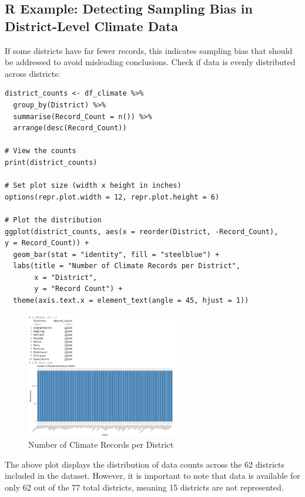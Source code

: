 \subsection*{R Example: Detecting Sampling Bias in District-Level Climate Data}

If some districts have far fewer records, this indicates sampling bias that should be addressed to avoid misleading conclusions. Check if data is evenly distributed across districts:

\begin{verbatim}
district_counts <- df_climate %>%
  group_by(District) %>%
  summarise(Record_Count = n()) %>%
  arrange(desc(Record_Count))

# View the counts
print(district_counts)

# Set plot size (width x height in inches)
options(repr.plot.width = 12, repr.plot.height = 6)

# Plot the distribution
ggplot(district_counts, aes(x = reorder(District, -Record_Count), 
y = Record_Count)) +
  geom_bar(stat = "identity", fill = "steelblue") +
  labs(title = "Number of Climate Records per District",
       x = "District",
       y = "Record Count") +
  theme(axis.text.x = element_text(angle = 45, hjust = 1))
\end{verbatim}

\begin{figure}[h]
\centering
\includegraphics[width=0.6\textwidth]{figures/dist_count.png}
\caption{Number of Climate Records per District}
\end{figure}

The above plot displays the distribution of data counts across the 62 districts included in the dataset. However, it is important to note that data is available for only 62 out of the 77 total districts, meaning 15 districts are not represented.

